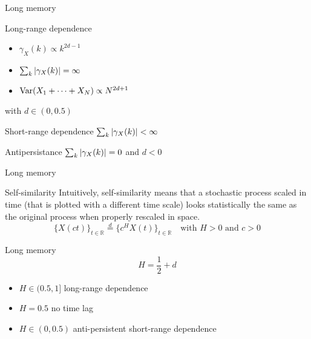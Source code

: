 \documentclass{beamer}
\newcommand{\numberset}{\mathbb}
\newcommand{\R}{\numberset{R}}
\newcommand{\deq}{\overset{d}{=}}
\begin{document}
\begin{frame}{Long memory}
	\begin{block}{Long-range dependence}
		\begin{itemize}
			\item $\gamma_X(k) \propto	k^{2d -1}$
			\item $\sum_{k} \abs{\gamma_X(k)} = \infty$
			\item $\textnormal{Var}(X_1 + \dots + X_N) \propto N^{2d + 1}$
		\end{itemize}
		with $ d \in (0, 0.5) $
	\end{block}
	\begin{block}{Short-range dependence}
		$\sum_{k} \abs{\gamma_X(k)} < \infty$
	\end{block}
	\begin{block}{Antipersistance}
		$\sum_{k} \abs{\gamma_X(k)} = 0$ and $d < 0$
	\end{block}
\end{frame}


\begin{frame}{Long memory}
	\begin{block}{Self-similarity}
		Intuitively, self-similarity means that a stochastic process scaled in time (that is plotted with a different time scale) looks statistically the same as the original process when properly rescaled in space. 
		\begin{equation*}
			\{ X(ct) \}_{t \in \R} \deq \{ c^H X(t) \}_{t \in \R}  \quad \text{with $H>0$ and $c>0$}		
		\end{equation*} 
	\end{block}
\end{frame}

\begin{frame}{Long memory}
	\begin{equation*}
		H = \frac{1}{2} + d
	\end{equation*}
	\begin{itemize}
		\item $H \in (0.5, 1]$ long-range dependence
		\item $H = 0.5$ no time lag
		\item $H \in (0, 0.5)$ anti-persistent short-range dependence 
	\end{itemize}
\end{frame}
\end{document}

